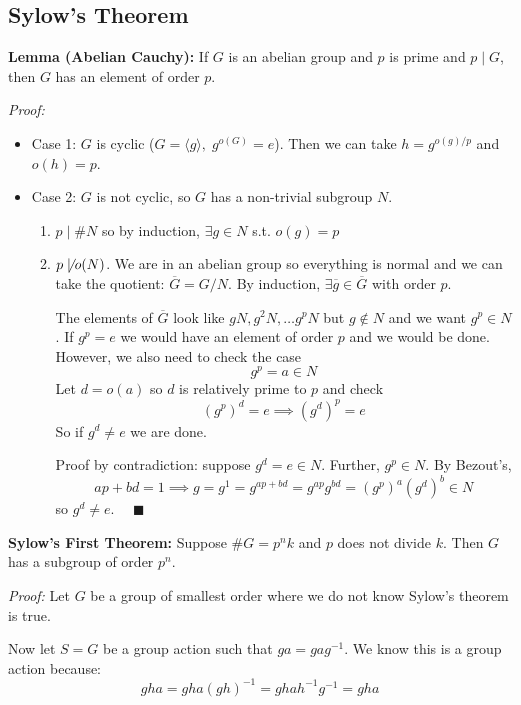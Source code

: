 \documentclass[12pt]{report}
\newcommand{\qed}{\quad \blacksquare}
\begin{document}
    \subsection*{Sylow's Theorem}
        \textbf{Lemma (Abelian Cauchy):} If $G$ is an abelian group and $p$ is prime and $p \; | \; G$, then $G$ has an element of order $p$. 

        \emph{Proof:} 
        \begin{itemize}
            \item Case 1: $G$ is cyclic ($G = \langle g \rangle, \; g^{o(G)} = e$). Then we can take $h = g^{o(g)/p}$ and $o(h) = p$. 
            \item Case 2: $G$ is not cyclic, so $G$ has a non-trivial subgroup $N$. 
            \begin{enumerate}
                \item $p \; | \; \#N$ so by induction, $\exists g\in N$ s.t. $o(g) = p$
                \item $p \not \mid o(N)$. We are in an abelian group so everything is normal and we can take the quotient: $\overline G = G/N$. By induction, $\exists \overline g\in \overline G$ with order $p$. 
                
                The elements of $\overline G$ look like $gN, g^2N, \dots g^pN$ but $g \not \in N$ and we want $g^p \in N$. If $g^p = e$ we would have an element of order $p$ and we would be done. However, we also need to check the case 
                \[g^p = a \in N\]
                Let $d = o(a)$ so $d$ is relatively prime to $p$ and check 
                \[(g^p)^d = e \implies (g^d)^p = e\]
                So if $g^d \neq e$ we are done. 

                Proof by contradiction: suppose $g^d = e \in N$. Further, $g^p \in N$. 
                By Bezout's,
                \[ap + bd = 1 \implies g = g^1 = g^{ap+bd} = g^{ap}g^{bd}= (g^p)^a(g^d)^b \in N\] 
                so $g^d \neq e$. $\qed$
            \end{enumerate}
        \end{itemize}

        \textbf{Sylow's First Theorem:} Suppose $\#G = p^nk$ and $p$ does not divide $k$. Then $G$ has a subgroup of order $p^n$. 

        \emph{Proof:} Let $G$ be a group of smallest order where we do not know Sylow's theorem is true. 

        Now let $S = G$ be a group action such that $ga = gag^{-1}$. We know this is a group action because:
        \[gha = gha(gh)^{-1} = ghah^{-1}g^{-1} = gha\]
\end{document}
